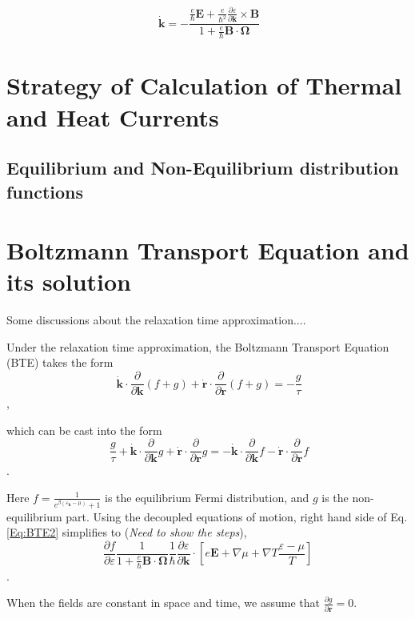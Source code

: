 \documentclass{revtex4-2}
\newcommand{\bvec}[1]{{\mathbf #1}}
\begin{document}
\begin{equation}~\label{Eq:SC_EOM_k_dot_decoupled}
	\dot{\bvec{k}} = -\frac{\frac{e}{\hbar} \bvec{E} +\frac{e}{\hbar^2} \frac{\partial \varepsilon}{\partial \bvec{k}} \times \bvec{B}}{1 + \frac{e}{\hbar} \bvec{B}\cdot\bvec{\Omega}}
\end{equation}
\section{Strategy of Calculation of Thermal and Heat Currents}
\subsection{Equilibrium and Non-Equilibrium distribution functions}
\section{Boltzmann Transport Equation and its solution}
Some discussions about the relaxation time approximation....

Under the relaxation time approximation, the Boltzmann Transport Equation (BTE) takes the form
\begin{equation}~\label{Eq:BTE}
\dot{\bvec{k}}\cdot\frac{\partial}{\partial \bvec{k}} (f + g) + \dot{\bvec{r}}\cdot\frac{\partial}{\partial \bvec{r}} (f + g) = -\frac{g}{\tau}
\end{equation},

which can be cast into the form
\begin{equation}~\label{Eq:BTE2}
	\frac{g}{\tau} + \dot{\bvec{k}}\cdot\frac{\partial}{\partial \bvec{k}} g + \dot{\bvec{r}}\cdot\frac{\partial}{\partial \bvec{r}} g = -\dot{\bvec{k}}\cdot\frac{\partial}{\partial \bvec{k}}f - \dot{\bvec{r}}\cdot\frac{\partial}{\partial \bvec{r}}f
\end{equation}.

Here $f = \frac{1}{e^{\beta(\varepsilon_{\bvec{k}} - \mu)} + 1}$ is the equilibrium Fermi distribution, and $g$ is the non-equilibrium part.
Using the decoupled equations of motion, right hand side of Eq. \eqref{Eq:BTE2} simplifies to (\textit{Need to show the steps}),
$$\frac{\partial f}{\partial \varepsilon}\frac{1}{1 + \frac{e}{\hbar} \bvec{B}\cdot\bvec{\Omega}}
\frac{1}{\hbar} \frac{\partial \varepsilon}{\partial \bvec{k}}\cdot\left[e \bvec{E} + \nabla{\mu} + \nabla T \frac{\varepsilon - \mu}{T}\right]
$$.

When the fields are constant in space and time, we assume that $\frac{\partial{g}}{\partial \bvec{r}} = 0$.
\end{document}
